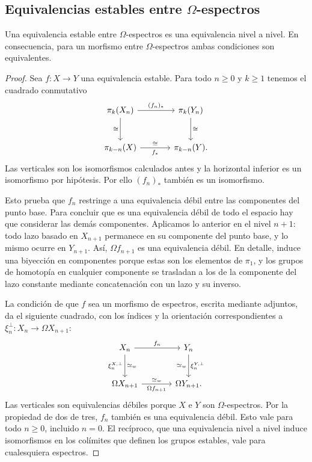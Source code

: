 \subsection{Equivalencias estables entre \texorpdfstring{$\Omega$}{Omega}-espectros}

\begin{prop}\label{prop:c10-omega-equivalencias}
Una equivalencia estable entre $\Omega$-espectros es una equivalencia nivel a nivel. En consecuencia, para un morfismo entre $\Omega$-espectros ambas condiciones son equivalentes.
\end{prop}
\begin{proof}
Sea $f\colon X\to Y$ una equivalencia estable. Para todo $n\ge0$ y $k\ge1$ tenemos el cuadrado conmutativo
\[
\begin{tikzcd}[column sep=large,row sep=large]
\pi_k(X_n) \arrow[r,"(f_n)_*"] \arrow[d,"\cong"']
& \pi_k(Y_n) \arrow[d,"\cong"]\\
\pi_{k-n}(X) \arrow[r,"f_*"',"\cong"]
& \pi_{k-n}(Y).
\end{tikzcd}
\]
Las verticales son los isomorfismos calculados antes y la horizontal inferior es un isomorfismo por hipótesis. Por ello $(f_n)_*$ también es un isomorfismo.

Esto prueba que $f_n$ restringe a una equivalencia débil entre las componentes del punto base. Para concluir que es una equivalencia débil de todo el espacio hay que considerar las demás componentes. Aplicamos lo anterior en el nivel $n+1$: todo lazo basado en $X_{n+1}$ permanece en su componente del punto base, y lo mismo ocurre en $Y_{n+1}$. Así, $\Omega f_{n+1}$ es una equivalencia débil. En detalle, induce una biyección en componentes porque estas son los elementos de $\pi_1$, y los grupos de homotopía en cualquier componente se trasladan a los de la componente del lazo constante mediante concatenación con un lazo y su inverso.

La condición de que $f$ sea un morfismo de espectros, escrita mediante adjuntos, da el siguiente cuadrado, con los índices y la orientación correspondientes a $\xi_n^\perp\colon X_n\to\Omega X_{n+1}$:
\[
\begin{tikzcd}[column sep=large,row sep=large]
X_n \arrow[r,"f_n"] \arrow[d,"\xi_n^{X,\perp}"',"\simeq_w"]
& Y_n \arrow[d,"\xi_n^{Y,\perp}","\simeq_w"']\\
\Omega X_{n+1} \arrow[r,"\Omega f_{n+1}"',"\simeq_w"]
& \Omega Y_{n+1}.
\end{tikzcd}
\]
Las verticales son equivalencias débiles porque $X$ e $Y$ son $\Omega$-espectros. Por la propiedad de dos de tres, $f_n$ también es una equivalencia débil. Esto vale para todo $n\ge0$, incluido $n=0$. El recíproco, que una equivalencia nivel a nivel induce isomorfismos en los colímites que definen los grupos estables, vale para cualesquiera espectros.
\end{proof}


